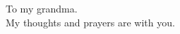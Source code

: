 \pagestyle{empty}
{\selectfont \begin{center}\Large To my grandma.\\ My thoughts and prayers are with you. \end{center}}
\cleardoublepage
